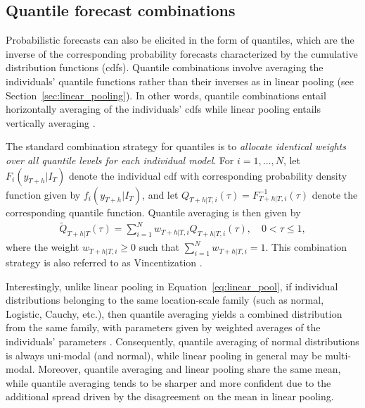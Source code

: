 \documentclass[11pt]{article}
\begin{document}
\subsection{Quantile forecast combinations}
\label{sec:quantile_comb}

Probabilistic forecasts can also be elicited in the form of quantiles, which are the inverse of the corresponding probability forecasts characterized by the cumulative distribution functions (cdfs). Quantile combinations involve averaging the individuals' quantile functions rather than their inverses as in linear pooling (see Section~\ref{sec:linear_pooling}). In other words, quantile combinations entail horizontally averaging of the individuals' cdfs while linear pooling entails vertically averaging \citep{Lichtendahl2013-rt}.

The standard combination strategy for quantiles is to \textit{allocate identical weights over all quantile levels for each individual model}. For $i=1,\dots,N$, let $F_{i}(y_{T+h}|I_{T})$ denote the individual cdf with corresponding probability density function given by $f_{i}(y_{T+h}|I_{T})$, and let $Q_{T+h|T,i}(\tau) = F_{T+h|T,i}^{-1}(\tau)$ denote the corresponding quantile function. Quantile averaging is then given by
\begin{align}
  \label{eq:quantile_avg}
  \tilde{Q}_{T+h|T}(\tau) = \sum_{i=1}^{N} w_{T+h|T,i} Q_{T+h|T,i}(\tau), \quad 0 < \tau \leq 1,
\end{align}
where the weight $w_{T+h|T,i}\ge0$ such that $\sum_{i=1}^{N}w_{T+h|T,i}=1$. This combination strategy is also referred to as Vincentization \citep{vincent1912-fu}. 

Interestingly, unlike linear pooling in Equation~\eqref{eq:linear_pool}, if individual distributions belonging to the same location-scale family (such as normal, Logistic, Cauchy, etc.), then quantile averaging yields a combined distribution from the same family, with parameters given by weighted averages of the individuals' parameters \citep{Ratcliff1979-cb,Thomas1980-lp}. Consequently, quantile averaging of normal distributions is always uni-modal (and normal), while linear pooling in general may be multi-modal. Moreover, quantile averaging and linear pooling share the same mean, while quantile averaging tends to be sharper and more confident due to the additional spread driven by the disagreement on the mean in linear pooling.
\end{document}
